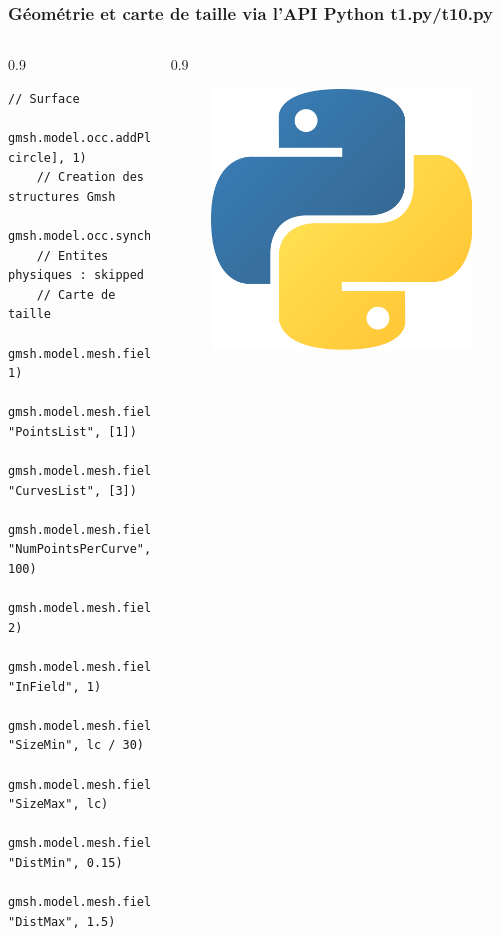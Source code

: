 \documentclass[aspectratio=169]{beamer}
\begin{document}
\begin{frame}[fragile]
\frametitle{Géométrie et carte de taille via l'API Python \hfill t1.py/t10.py}
  \footnotesize
  \begin{columns}
    \begin{column}{0.9\linewidth}
    \begin{lstlisting}[frame=none, aboveskip=3mm]
    // Surface
    gmsh.model.occ.addPlaneSurface([boundary, circle], 1)
    // Creation des structures Gmsh
    gmsh.model.occ.synchronize()
    // Entites physiques : skipped
    // Carte de taille
    gmsh.model.mesh.field.add("Distance", 1)
    gmsh.model.mesh.field.setNumbers(1, "PointsList", [1])
    gmsh.model.mesh.field.setNumbers(1, "CurvesList", [3])
    gmsh.model.mesh.field.setNumber(1, "NumPointsPerCurve", 100)
    gmsh.model.mesh.field.add("Threshold", 2)
    gmsh.model.mesh.field.setNumber(2, "InField", 1)
    gmsh.model.mesh.field.setNumber(2, "SizeMin", lc / 30)
    gmsh.model.mesh.field.setNumber(2, "SizeMax", lc)
    gmsh.model.mesh.field.setNumber(2, "DistMin", 0.15)
    gmsh.model.mesh.field.setNumber(2, "DistMax", 1.5)
    \end{lstlisting}
    \end{column}
    \begin{column}{0.9\linewidth}
      \begin{figure}
        \vspace{-5.5cm}
        \hspace{-8cm}
        \includegraphics[width=0.1\linewidth]{figures/py.png}
        \caption{}
        \label{}
      \end{figure}
    \end{column}
  \end{columns}
\end{frame}
\end{document}
